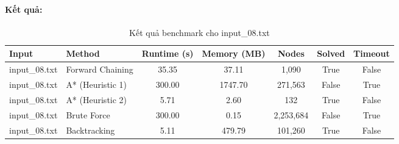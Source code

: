 \paragraph{Kết quả:}
\begin{table}[H]
\centering
\begin{tabular}{|l|l|c|c|c|c|c|}
\hline
\textbf{Input} & \textbf{Method} & \textbf{Runtime (s)} & \textbf{Memory (MB)} & \textbf{Nodes} & \textbf{Solved} & \textbf{Timeout} \\
\hline
input\_08.txt & Forward Chaining & 35.35 & 37.11 & 1,090 & True & False \\
input\_08.txt & A* (Heuristic 1) & 300.00 & 1747.70 & 271,563 & False & True \\
input\_08.txt & A* (Heuristic 2) & 5.71 & 2.60 & 132 & True & False \\
input\_08.txt & Brute Force & 300.00 & 0.15 & 2,253,684 & False & True \\
input\_08.txt & Backtracking & 5.11 & 479.79 & 101,260 & True & False \\
\hline
\end{tabular}
\caption{Kết quả benchmark cho input\_08.txt}
\end{table}

